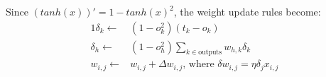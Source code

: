 \documentclass[10pt,a4paper,boxed]{hmcpset}
\begin{document}
		\begin{problem}
		\end{problem}
		\begin{solution}
			Since $(tanh(x))' = 1-tanh(x)^2$, the weight update rules become: 
			\begin{alignat*}{1}
				\delta_k \leftarrow & \left( 1-o_k^2 \right) \left( t_k - o_k \right) \\
				\delta_h \leftarrow & \left( 1-o_h^2 \right) \sum_{k \in \textrm{outputs}} w_{h,k} \delta_k \\
				w_{i,j} \leftarrow & w_{i,j} + \Delta w_{i,j},\,\mbox{where } \delta w_{i,j} = \eta \delta_j x_{i,j}
			\end{alignat*}
		\end{solution}		
		
\end{document}
